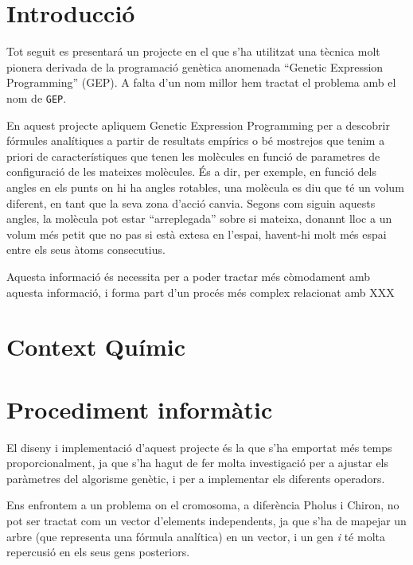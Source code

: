 \documentclass[titlepage,a4paper,12pt]{book}
\begin{document}
\tableofcontents  %

\section{Introducció} %
	\label{sec:Introduccio}
	Tot seguit es presentará un projecte en el que s'ha utilitzat una tècnica
	molt pionera derivada de la programació genètica anomenada ``Genetic
	Expression Programming'' (GEP).  A falta d'un nom millor hem tractat el
	problema amb el nom de \texttt{GEP}.

	En aquest projecte apliquem Genetic Expression Programming per a descobrir
	fórmules analítiques a partir de resultats empírics o bé mostrejos que tenim
	a priori de característiques que tenen les molècules en funció de parametres
	de configuració de les mateixes molècules.  És a dir, per exemple, en funció
	dels angles en els punts on hi ha angles rotables, una molècula es diu que
	té un volum diferent, en tant que la seva zona d'acció canvia.  Segons com
	siguin aquests angles, la molècula pot estar ``arreplegada'' sobre si
	mateixa, donannt lloc a un volum més petit que no pas si està extesa en
	l'espai, havent-hi molt més espai entre els seus àtoms consecutius.

	Aquesta informació és necessita per a poder tractar més còmodament amb
	aquesta informació, i forma part d'un procés més complex relacionat amb XXX



\section{Context Químic} %
	\label{sec:Context Quimic}

\section{Procediment informàtic} %
\label{sec:Procediment informatic}

El diseny i implementació  d'aquest projecte és la que s'ha emportat més temps
proporcionalment, ja que s'ha hagut de fer molta investigació per a ajustar els
paràmetres del algorisme genètic, i per a implementar els diferents operadors.

Ens enfrontem a un problema on el cromosoma, a diferència Pholus i Chiron, no
pot ser tractat com un vector d'elements independents, ja que s'ha de mapejar un
arbre (que representa una fórmula analítica) en un vector, i un gen
\textit{i} té molta repercusió en els seus gens posteriors.
\end{document}
